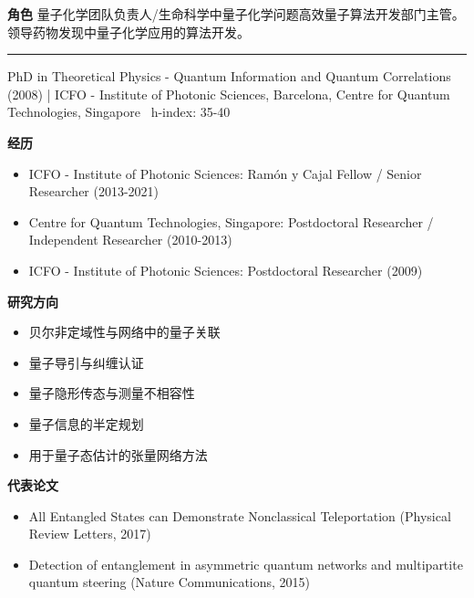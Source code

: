 \par{\footnotesize\color{mainred}\textbf{角色}} {\footnotesize 量子化学团队负责人/生命科学中量子化学问题高效量子算法开发部门主管。领导药物发现中量子化学应用的算法开发。}
\vspace{2pt}\hrule\vspace{2pt}
\vspace{4pt}
\par{\footnotesize\color{graytext}PhD in Theoretical Physics - Quantum Information and Quantum Correlations (2008) | ICFO - Institute of Photonic Sciences, Barcelona, Centre for Quantum Technologies, Singapore \textbar\  h-index: 35-40}
\par{\footnotesize\color{mainred}\textbf{经历}}
\begin{itemize}[leftmargin=1.2em,itemsep=0pt,topsep=0pt]
\item {\footnotesize ICFO - Institute of Photonic Sciences: Ramón y Cajal Fellow / Senior Researcher (2013-2021)}
\item {\footnotesize Centre for Quantum Technologies, Singapore: Postdoctoral Researcher / Independent Researcher (2010-2013)}
\item {\footnotesize ICFO - Institute of Photonic Sciences: Postdoctoral Researcher (2009)}
\end{itemize}
\par{\footnotesize\color{mainred}\textbf{研究方向}}
\begin{itemize}[leftmargin=1.2em,itemsep=0pt,topsep=0pt]
\item {\footnotesize 贝尔非定域性与网络中的量子关联}
\item {\footnotesize 量子导引与纠缠认证}
\item {\footnotesize 量子隐形传态与测量不相容性}
\item {\footnotesize 量子信息的半定规划}
\item {\footnotesize 用于量子态估计的张量网络方法}
\end{itemize}
\par{\footnotesize\color{mainred}\textbf{代表论文}}
\begin{itemize}[leftmargin=1.2em,itemsep=0pt,topsep=0pt]
\item {\footnotesize All Entangled States can Demonstrate Nonclassical Teleportation (Physical Review Letters, 2017)}
\item {\footnotesize Detection of entanglement in asymmetric quantum networks and multipartite quantum steering (Nature Communications, 2015)}
\end{itemize}
